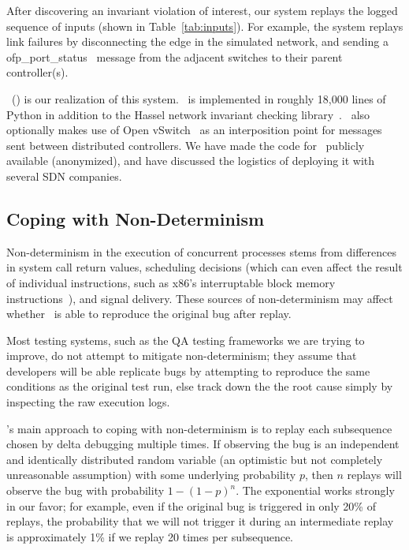 After discovering an invariant violation of interest, our system replays
the logged sequence of inputs (shown in Table~\ref{tab:inputs}). For example,
the system replays link failures
by disconnecting the edge in the simulated network, and sending a
ofp\_port\_status~\cite{openflow} message from the adjacent switches to their parent controller(s).

\projectname~(\projectmeaning) is our realization of this system.
\projectname~is implemented in roughly 18,000 lines of Python in
addition to the Hassel network invariant checking library~\cite{hsa}.
\projectname~also optionally makes use of Open vSwitch~\cite{pfaff2009extending} as an interposition point for
messages sent between distributed controllers. We have
made the code
for \projectname~publicly available (anonymized), %
and have discussed the logistics of deploying it with several SDN companies.



\subsection{Coping with Non-Determinism}

Non-determinism in the execution of concurrent processes stems from
differences in system call return values, scheduling decisions (which can
even affect the result of individual instructions, such as x86's
interruptable block memory instructions~\cite{Dunlap:2002:REI:844128.844148}), and signal
delivery. These sources of non-determinism may affect whether \projectname~is
able to reproduce the original bug after replay.

Most testing systems, such as the QA testing frameworks we are
trying to improve, do not attempt to mitigate non-determinism; they assume
that developers will be able replicate bugs by attempting to reproduce the
same conditions as the original test run, else track down the the root cause simply by
inspecting the raw execution logs.

\projectname's main approach to coping with non-determinism
is to replay each subsequence chosen
by delta debugging multiple times. If observing the bug
is an independent and identically distributed random variable (an optimistic
but not completely unreasonable assumption) with some
underlying probability $p$, then $n$
replays will observe the bug with probability $1-(1-p)^{n}$. The exponential
works strongly in our favor; for example, even if the original bug is
triggered in only 20\% of replays, the probability that we will not trigger
it during an intermediate replay is approximately
1\% if we replay 20 times per subsequence.

